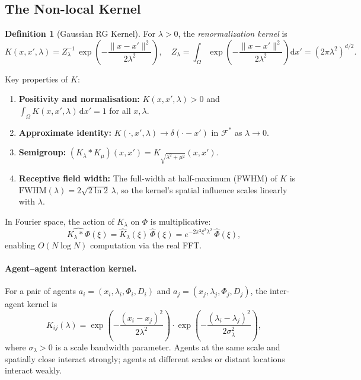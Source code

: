 \documentclass[12pt,a4paper]{article}
\theoremstyle{plain}
\theoremstyle{definition}
\newtheorem{definition}[theorem]{Definition}
\theoremstyle{remark}
\newcommand{\cF}{\mathcal{F}}
\newcommand{\dd}{\mathrm{d}}
\newcommand{\Kij}{K_{ij}}
\begin{document}
\subsection{The Non-local Kernel}
\label{sec:theory:kernel}

\begin{definition}[Gaussian RG Kernel]
  For $\lambda > 0$, the \emph{renormalization kernel} is
  \begin{equation}
    K(x, x', \lambda)
    = Z_\lambda^{-1}\,\exp\!\left(-\frac{\|x - x'\|^2}{2\lambda^2}\right),
    \quad
    Z_\lambda = \int_\Omega \exp\!\left(-\frac{\|x-x'\|^2}{2\lambda^2}\right)\dd x'
              = (2\pi\lambda^2)^{d/2}.
    \label{eq:kernel}
  \end{equation}
\end{definition}

\noindent Key properties of $K$:
\begin{enumerate}[label=(\alph*)]
  \item \textbf{Positivity and normalisation:}
    $K(x,x',\lambda) > 0$ and
    $\int_\Omega K(x,x',\lambda)\,\dd x' = 1$ for all $x, \lambda$.
  \item \textbf{Approximate identity:}
    $K(\cdot,x',\lambda) \to \delta(\cdot - x')$ in $\cF^*$ as $\lambda \to 0$.
  \item \textbf{Semigroup:}
    $(K_\lambda * K_\mu)(x,x') = K_{\sqrt{\lambda^2+\mu^2}}(x,x')$.
  \item \textbf{Receptive field width:}
    The full-width at half-maximum (FWHM) of $K$ is
    $\text{FWHM}(\lambda) = 2\sqrt{2\ln 2}\,\lambda$,
    so the kernel's spatial influence scales linearly with $\lambda$.
\end{enumerate}

In Fourier space, the action of $K_\lambda$ on $\Phi$ is
multiplicative:
\begin{equation}
  \widehat{K_\lambda * \Phi}(\xi)
  = \hat{K}_\lambda(\xi)\,\hat{\Phi}(\xi)
  = e^{-2\pi^2\xi^2\lambda^2}\,\hat{\Phi}(\xi),
  \label{eq:fourier_kernel}
\end{equation}
enabling $O(N\log N)$ computation via the real FFT.

\paragraph{Agent–agent interaction kernel.}
For a pair of agents $a_i = (x_i, \lambda_i, \Phi_i, D_i)$ and
$a_j = (x_j, \lambda_j, \Phi_j, D_j)$, the inter-agent kernel is
\begin{equation}
  \Kij(\lambda)
  = \exp\!\left(-\frac{(x_i - x_j)^2}{2\lambda^2}\right)
    \cdot \exp\!\left(-\frac{(\lambda_i - \lambda_j)^2}{2\sigma_\lambda^2}\right),
  \label{eq:agent_kernel}
\end{equation}
where $\sigma_\lambda > 0$ is a scale bandwidth parameter.
Agents at the same scale and spatially close interact strongly;
agents at different scales or distant locations interact weakly.
\end{document}
